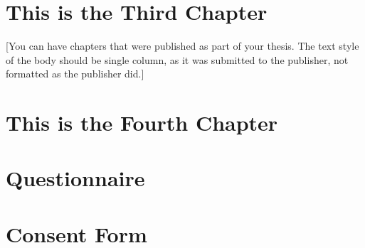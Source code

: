 \documentclass[12pt]{caltech_thesis}
\begin{document}
\chapter{This is the Third Chapter}




[You can have chapters that were published as part of your thesis. The text style of the body should be single column, as it was submitted to the publisher, not formatted as the publisher did.]

\chapter{This is the Fourth Chapter}

\appendix

\chapter{Questionnaire}
\chapter{Consent Form}

\printindex

\theendnotes
\end{document}

